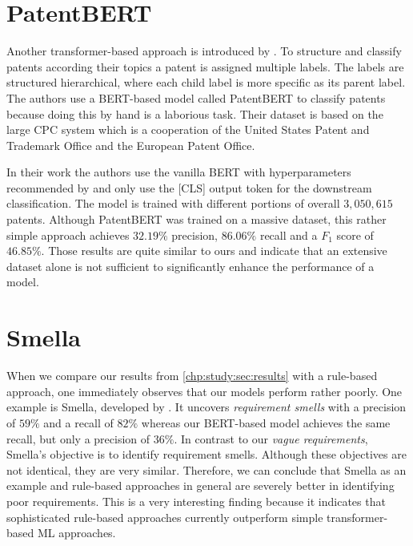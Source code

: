 \section{PatentBERT}
Another transformer-based approach is introduced by \textcite{Lee:2019}.
To structure and classify patents according their topics a patent is assigned multiple labels.
The labels are structured hierarchical, where each child label is more specific as its parent label.
The authors use a \ac{BERT}-based model called PatentBERT to classify patents because doing this by hand is a laborious task.
Their dataset is based on the large \ac{CPC} system which is a cooperation of the United States Patent and Trademark Office and the European Patent Office.

In their work the authors use the vanilla \ac{BERT} with hyperparameters recommended by \textcite{Devlin:2018} and only use the [CLS] output token for the downstream classification.
The model is trained with different portions of overall $3,050,615$ patents.
Although PatentBERT was trained on a massive dataset, this rather simple approach achieves $32.19\%$ precision, $86.06\%$ recall and a $F_1$ score of $46.85\%$.
Those results are quite similar to ours and indicate that an extensive dataset alone is not sufficient to significantly enhance the performance of a model.

\section{Smella}
When we compare our results from \cref{chp:study:sec:results} with a rule-based approach, one immediately observes that our models perform rather poorly.
One example is Smella, developed by \textcite{Femmer:2017}.
It uncovers \textit{requirement smells} with a precision of $59\%$ and a recall of $82\%$ whereas our \ac{BERT}-based model achieves the same recall, but only a precision of $36\%$.
In contrast to our \textit{vague requirements}, Smella's objective is to identify requirement smells.
Although these objectives are not identical, they are very similar.
Therefore, we can conclude that Smella as an example and rule-based approaches in general are severely better in identifying poor requirements.
This is a very interesting finding because it indicates that sophisticated rule-based approaches currently outperform simple transformer-based \ac{ML} approaches.

